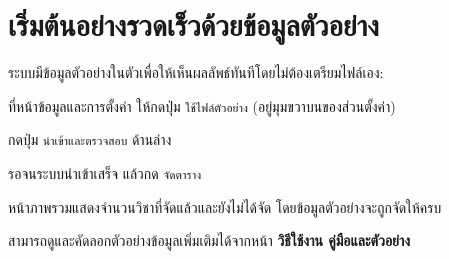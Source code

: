 \section{เริ่มต้นอย่างรวดเร็วด้วยข้อมูลตัวอย่าง}

ระบบมีข้อมูลตัวอย่างในตัวเพื่อให้เห็นผลลัพธ์ทันทีโดยไม่ต้องเตรียมไฟล์เอง:

\begin{steps}
  \item ที่หน้าข้อมูลและการตั้งค่า ให้กดปุ่ม \texttt{ใช้ไฟล์ตัวอย่าง}
        (อยู่มุมขวาบนของส่วนตั้งค่า)
  \item กดปุ่ม \texttt{นำเข้าและตรวจสอบ} ด้านล่าง
  \item รอจนระบบนำเข้าเสร็จ แล้วกด \texttt{จัดตาราง}
\end{steps}

\begin{expected}
หน้าภาพรวมแสดงจำนวนวิชาที่จัดแล้วและยังไม่ได้จัด โดยข้อมูลตัวอย่างจะถูกจัดให้ครบ
\end{expected}

สามารถดูและคัดลอกตัวอย่างข้อมูลเพิ่มเติมได้จากหน้า
\textbf{วิธีใช้งาน คู่มือและตัวอย่าง}


